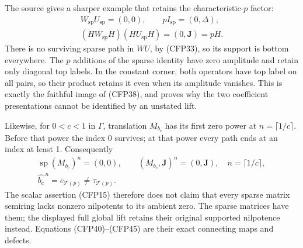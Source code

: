 The source gives a sharper example that
retains the characteristic-$p$ factor:
\begin{equation}\tag{CFP44}
\begin{gathered}
 W_{\mathrm{sp}}U_{\mathrm{sp}}=(0,0),\qquad
 pI_{\mathrm{sp}}=(0,\Delta),\\
 (HW_{\mathrm{sp}}H)(HU_{\mathrm{sp}}H)
          =(0,\mathbf J)=pH.
\end{gathered}
\end{equation}
There is no surviving sparse path in
$WU$, by (CFP33), so its support is
bottom everywhere. The $p$ additions
of the sparse identity have zero
amplitude and retain only diagonal
top labels. In the constant corner,
both operators have top label on
all pairs, so their product retains
it even when its amplitude vanishes.
This is exactly the faithful image
of (CFP38), and proves why the two
coefficient presentations cannot be
identified by an unstated lift.

Likewise, for $0<c<1$ in $\Gamma$,
translation $M_{b_c}$ has its first
zero power at $n=\lceil1/c\rceil$.
Before that power the index $0$
survives; at that power every path
ends at an index at least 1.
Consequently
\begin{equation}\tag{CFP45}
\begin{gathered}
 \operatorname{sp}(M_{b_c})^n=(0,0),\qquad
        (M_{b_c},\mathbf J)^n=(0,\mathbf J),
                         \quad n=\lceil1/c\rceil,\\
 \widehat{b_c}^{\,n}=e_{\mathcal T(p)}\ne\tau_{\mathcal T(p)}.
\end{gathered}
\end{equation}
The scalar assertion (CFP15) therefore
does not claim that every sparse
matrix semiring lacks nonzero
nilpotents to its ambient zero.
The sparse matrices have them;
the displayed full global lift
retains their original supported
nilpotence instead. Equations
(CFP40)--(CFP45) are their exact
connecting maps and defects.

